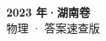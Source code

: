 \documentclass[zihao=-4, a4paper]{ctexart}
\begin{document}
\begin{center}
  {\Large\bfseries 2023 年·湖南卷}\\[4pt]
  {\large 物理 · 答案速查版}
\end{center}
\medskip
{}

\clearpage
{}

\end{document}
